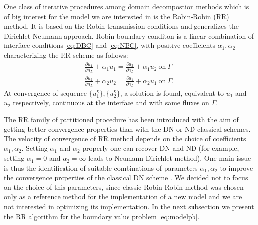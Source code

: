 One class of iterative procedures among domain decompostion methods which is of big interest for the model we are interested in is the Robin-Robin (RR) method. It is based on the Robin transmission conditions and generalizes the Dirichlet-Neumann approach. Robin boundary conditon is a linear combination of interface conditions \eqref{eq:DBC} and \eqref{eq:NBC}, with positive coefficients $\alpha_1, \alpha_2$ characterizing the RR scheme as follows:
\begin{equation}\begin{aligned}
  \frac{\partial u_1}{\partial n_L}  + \alpha_1 u_1 = \frac{\partial u_2}{\partial n_L} + \alpha_1 u_2 \ \text{on} \ \Gamma
  \\
  \frac{\partial u_2}{\partial n_L} + \alpha_2 u_2  =   \frac{\partial u_1}{\partial n_L}  + \alpha_2 u_1 \ \text{on} \ \Gamma.
\end{aligned} \end{equation}
At convergence of sequence $\{u_1^k\}, \{u_2^k\}$, a solution is found, equivalent to $u_1$ and $u_2$ respectively, continuous at the interface and with same fluxes on $\Gamma$.

The RR family of partitioned procedure has been introduced with the aim of getting better convergence properties than with the DN or ND classical schemes. The velocity of convergence of RR method depends on the choice of coefficients $\alpha_1, \alpha_2$. Setting $\alpha_1$ and $\alpha_2$ properly one can recover DN and ND (for example, setting $\alpha_1 = 0$ and $\alpha_2 = \infty$ leads to Neumann-Dirichlet method). One main issue is thus the identification of suitable combinations of parameters $\alpha_1, \alpha_2$ to improve the convergence properties of the classical DN scheme \cite{hou:RR, CV:RRnew}. We decided not to focus on the choice of this parameters, since classic Robin-Robin method was chosen only as a reference method for the  implementation of a new model and we are not interested in optimizing its implementation. In the next subsection we present the RR algorithm for the boundary value problem \eqref{eq:modelpb}.

